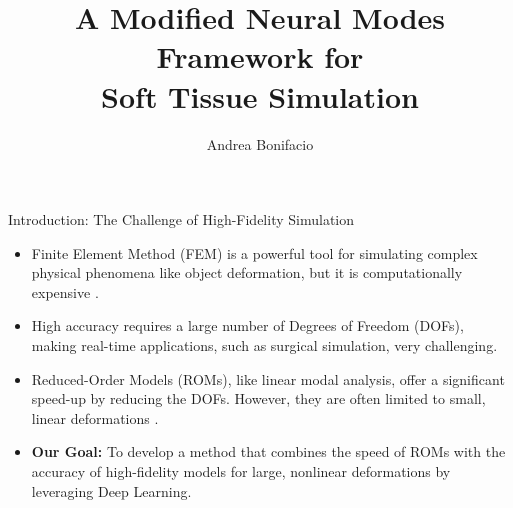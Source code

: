 \documentclass{beamer}
\title{A Modified Neural Modes Framework for\\ Soft Tissue Simulation}
\author{Andrea Bonifacio}
\date{}
\begin{document}
\begin{frame}
\titlepage
\end{frame}

\begin{frame}{Introduction: The Challenge of High-Fidelity Simulation}
    \begin{itemize}
        \item Finite Element Method (FEM) is a powerful tool for simulating complex physical phenomena like object deformation, but it is computationally expensive \cite{Quarteroni_2017}.
        
        \item High accuracy requires a large number of Degrees of Freedom (DOFs), making real-time applications, such as surgical simulation, very challenging.
        
        \item Reduced-Order Models (ROMs), like linear modal analysis, offer a significant speed-up by reducing the DOFs. However, they are often limited to small, linear deformations \cite{Pentland_Williams_1989}.
        
        \item \textbf{Our Goal:} To develop a method that combines the speed of ROMs with the accuracy of high-fidelity models for large, nonlinear deformations by leveraging Deep Learning.
        
    \end{itemize}
\end{frame}
\end{document}
